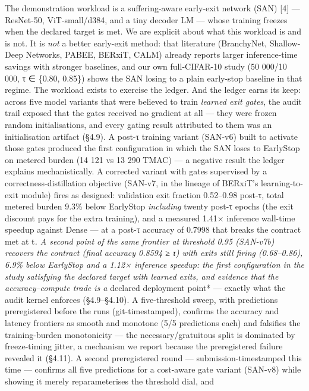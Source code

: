 \documentclass[
]{article}
\begin{document}
The demonstration workload is a suffering-aware early-exit network (SAN)
{[}4{]} --- ResNet-50, ViT-small/d384, and a tiny decoder LM --- whose
training freezes when the declared target is met. We are explicit about
what this workload is and is not. It is \emph{not} a better early-exit
method: that literature (BranchyNet, Shallow-Deep Networks, PABEE,
BERxiT, CALM) already reports larger inference-time savings with
stronger baselines, and our own full-CIFAR-10 study (50 000/10 000, τ ∈
\{0.80, 0.85\}) shows the SAN losing to a plain early-stop baseline in
that regime. The workload exists to exercise the ledger. And the ledger
earns its keep: across five model variants that were believed to train
\emph{learned exit gates}, the audit trail exposed that the gates
received no gradient at all --- they were frozen random initialisations,
and every gating result attributed to them was an initialisation
artifact (§4.9). A post-τ training variant (SAN-v6) built to activate
those gates produced the first configuration in which the SAN loses to
EarlyStop on metered burden (14 121 vs 13 290 TMAC) --- a negative
result the ledger explains mechanistically. A corrected variant with
gates supervised by a correctness-distillation objective (SAN-v7, in the
lineage of BERxiT's learning-to-exit module) fires as designed:
validation exit fraction 0.52--0.98 post-τ, total metered burden 9.3\%
below EarlyStop \emph{including} twenty post-τ epochs (the exit discount
pays for the extra training), and a measured 1.41× inference wall-time
speedup against Dense --- at a post-τ accuracy of 0.7998 that breaks the
contract met at t\emph{. A second point of the same frontier at
threshold 0.95 (SAN-v7b) recovers the contract (final accuracy 0.8594 ≥
τ) with exits still firing (0.68--0.86), 6.9\% below EarlyStop and a
1.12× inference speedup: the first configuration in the study satisfying
the declared target with learned exits, and evidence that the
accuracy--compute trade is a }declared deployment point* --- exactly
what the audit kernel enforces (§4.9--§4.10). A five-threshold sweep,
with predictions preregistered before the runs (git-timestamped),
confirms the accuracy and latency frontiers as smooth and monotone (5/5
predictions each) and falsifies the training-burden monotonicity --- the
necessary/gratuitous split is dominated by freeze-timing jitter, a
mechanism we report because the preregistered failure revealed it
(§4.11). A second preregistered round --- submission-timestamped this
time --- confirms all five predictions for a cost-aware gate variant
(SAN-v8) while showing it merely reparameterises the threshold dial, and
\end{document}
